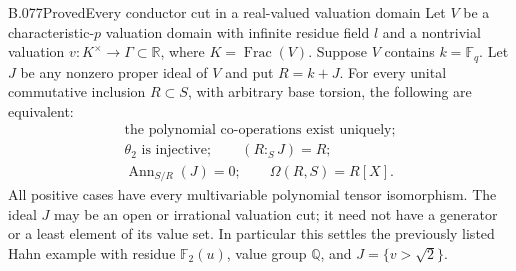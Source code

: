 \begin{saresult}{B.077}{Proved}{Every conductor cut in a real-valued valuation domain}
Let $V$ be a characteristic-$p$ valuation domain with infinite residue
field $l$ and a nontrivial valuation
$v:K^\times\to\Gamma\subset\mathbb R$, where
$K=\operatorname{Frac}(V)$. Suppose $V$ contains $k=\mathbb F_q$.
Let $J$ be any nonzero proper ideal of $V$ and put $R=k+J$.
For every unital commutative inclusion $R\subset S$, with arbitrary
base torsion, the following are equivalent:
\[
\begin{gathered}
 \text{the polynomial co-operations exist uniquely};\\
 \theta_2\text{ is injective};\qquad (R:_S J)=R;\\
 \operatorname{Ann}_{S/R}(J)=0;\qquad \Omega(R,S)=R[X].    \tag{B77.1}
\end{gathered}
\]
All positive cases have every multivariable polynomial tensor
isomorphism. The ideal $J$ may be an open or irrational valuation cut;
it need not have a generator or a least element of its value set.
In particular this settles the previously listed Hahn example with
residue $\mathbb F_2(u)$, value group $\mathbb Q$, and $J=\{v>\sqrt2\}$.
\end{saresult}
